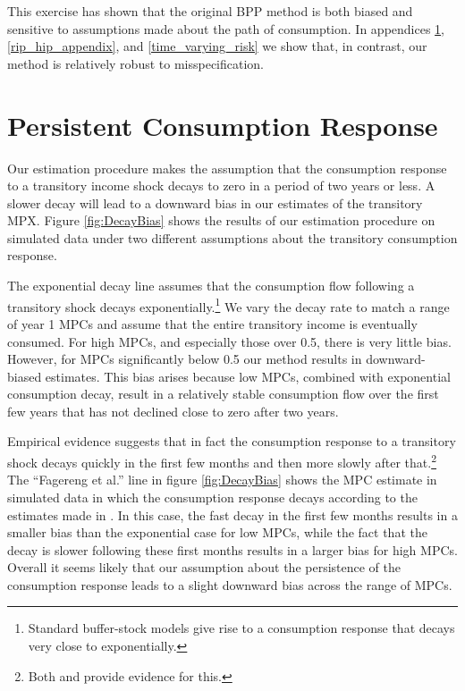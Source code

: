 \documentclass[titlepage]{\econtex}\newcommand{\texname}{ConsumptionHeterogeneity}
\begin{document}
	This exercise has shown that the original BPP method is both biased and sensitive to assumptions made about the path of consumption. In appendices \ref{Consumption_persistence}, \ref{rip_hip_appendix}, and \ref{time_varying_risk} we show that, in contrast, our method is relatively robust to misspecification.
	
	\section{Persistent Consumption Response} \label{Consumption_persistence}
	\setcounter{figure}{0}   
	\setcounter{table}{0} 
	
	Our estimation procedure makes the assumption that the consumption response to a transitory income shock decays to zero in a period of two years or less. A slower decay will lead to a downward bias in our estimates of the transitory MPX. Figure \ref{fig:DecayBias} shows the results of our estimation procedure on simulated data under two different assumptions about the transitory consumption response.
	
	The exponential decay line assumes that the consumption flow following a transitory shock decays exponentially.\footnote{Standard buffer-stock models give rise to a consumption response that decays very close to exponentially.} We vary the decay rate to match a range of year 1 MPCs and assume that the entire transitory income is eventually consumed. For high MPCs, and especially those over 0.5, there is very little bias. However, for MPCs significantly below 0.5 our method results in downward-biased estimates. This bias arises because low MPCs, combined with exponential consumption decay, result in a relatively stable consumption flow over the first few years that has not declined close to zero after two years.
	
	Empirical evidence suggests that in fact the consumption response to a transitory shock decays quickly in the first few months and then more slowly after that.\footnote{Both  and  provide evidence for this.} The ``Fagereng et al.'' line in figure \ref{fig:DecayBias} shows the MPC estimate in simulated data in which the consumption response decays according to the estimates made in . In this case, the fast decay in the first few months results in a smaller bias than the exponential case for low MPCs, while the fact that the decay is slower following these first months results in a larger bias for high MPCs. Overall it seems likely that our assumption about the persistence of the consumption response leads to a slight downward bias across the range of MPCs.
	
\end{document}
